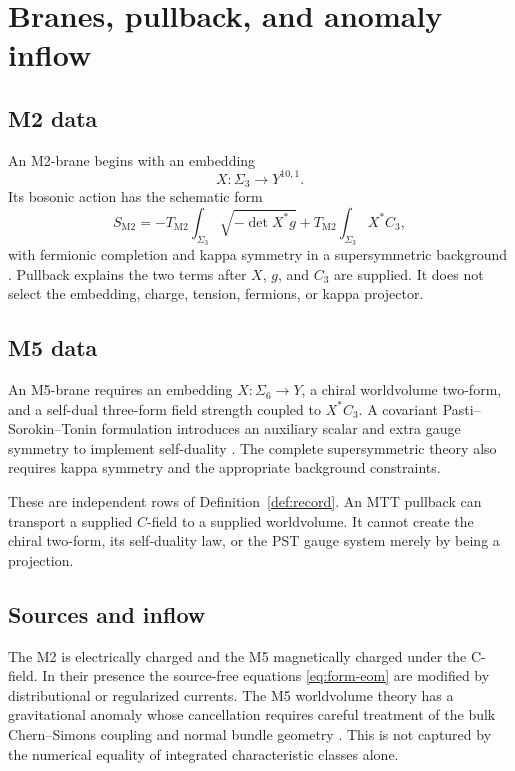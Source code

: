 \documentclass[11pt]{article}
\theoremstyle{definition}
\theoremstyle{remark}
\begin{document}
\section{Branes, pullback, and anomaly inflow}
\label{sec:branes}

\subsection{M2 data}

An M2-brane begins with an embedding
\[
X:\Sigma_3\longrightarrow Y^{10,1}.
\]
Its bosonic action has the schematic form
\begin{equation}
S_{\mathrm{M2}}
=-T_{\mathrm{M2}}\int_{\Sigma_3}
\sqrt{-\det X^\ast g}
+T_{\mathrm{M2}}\int_{\Sigma_3}X^\ast C_3,
\label{eq:m2}
\end{equation}
with fermionic completion and kappa symmetry in a supersymmetric background
\cite{BST1988}.  Pullback explains the two terms after \(X\), \(g\), and
\(C_3\) are supplied.  It does not select the embedding, charge, tension,
fermions, or kappa projector.

\subsection{M5 data}

An M5-brane requires an embedding
\(X:\Sigma_6\to Y\), a chiral worldvolume two-form, and a self-dual
three-form field strength coupled to \(X^\ast C_3\).  A covariant
Pasti--Sorokin--Tonin formulation introduces an auxiliary scalar and extra
gauge symmetry to implement self-duality \cite{PST1997}.  The complete
supersymmetric theory also requires kappa symmetry and the appropriate
background constraints.

These are independent rows of Definition~\ref{def:record}.  An MTT pullback can
transport a supplied \(C\)-field to a supplied worldvolume.  It cannot create
the chiral two-form, its self-duality law, or the PST gauge system merely by
being a projection.

\subsection{Sources and inflow}

The M2 is electrically charged and the M5 magnetically charged under the
C-field.  In their presence the source-free equations
\cref{eq:form-eom} are modified by distributional or regularized currents.
The M5 worldvolume theory has a gravitational anomaly whose cancellation
requires careful treatment of the bulk Chern--Simons coupling and normal
bundle geometry \cite{FHMM1998}.  This is not captured by the numerical
equality of integrated characteristic classes alone.
\end{document}
